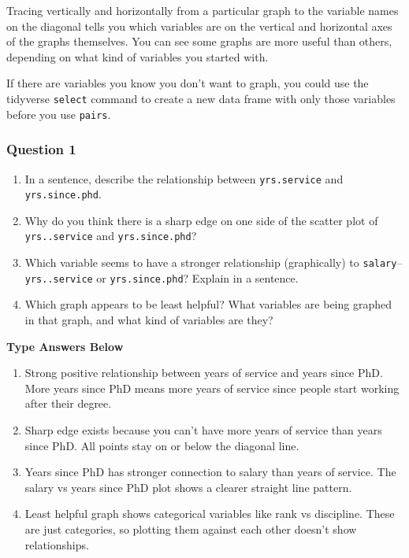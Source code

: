 \documentclass[
]{article}
\begin{document}
Tracing vertically and horizontally from a particular graph to the
variable names on the diagonal tells you which variables are on the
vertical and horizontal axes of the graphs themselves. You can see some
graphs are more useful than others, depending on what kind of variables
you started with.

If there are variables you know you don't want to graph, you could use
the tidyverse \texttt{select} command to create a new data frame with
only those variables before you use \texttt{pairs}.

\hypertarget{question-1}{%
\subsubsection{Question 1}\label{question-1}}

\begin{enumerate}
\def\labelenumi{\alph{enumi})}
\item
  In a sentence, describe the relationship between \texttt{yrs.service}
  and \texttt{yrs.since.phd}.
\item
  Why do you think there is a sharp edge on one side of the scatter plot
  of \texttt{yrs..service} and \texttt{yrs.since.phd}?
\item
  Which variable seems to have a stronger relationship (graphically) to
  \texttt{salary}--\texttt{yrs..service} or \texttt{yrs.since.phd}?
  Explain in a sentence.
\item
  Which graph appears to be least helpful? What variables are being
  graphed in that graph, and what kind of variables are they?
\end{enumerate}

\textbf{Type Answers Below}

\begin{enumerate}
\def\labelenumi{\alph{enumi})}
\item
  Strong positive relationship between years of service and years since
  PhD. More years since PhD means more years of service since people
  start working after their degree.
\item
  Sharp edge exists because you can't have more years of service than
  years since PhD. All points stay on or below the diagonal line.
\item
  Years since PhD has stronger connection to salary than years of
  service. The salary vs years since PhD plot shows a clearer straight
  line pattern.
\item
  Least helpful graph shows categorical variables like rank vs
  discipline. These are just categories, so plotting them against each
  other doesn't show relationships.
\end{enumerate}
\end{document}

